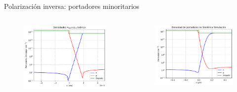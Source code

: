 \documentclass[aspectratio=169,xcolor=dvipsnames]{beamer}
\begin{document}
\begin{frame}{Polarización inversa: portadores minoritarios}
        \begin{columns}
            \begin{column}{0.5\textwidth}
                \begin{figure}
                    \includegraphics[width=0.90\linewidth]{Teorico/Densidad_portadores_inversa_cortada.pdf}
                \end{figure}
            \end{column}
            \begin{column}{0.5\textwidth}
                \begin{figure}
                    \includegraphics[width=0.90\linewidth]{Inversa/Densidad_portadores_inversa_cortada.pdf}
                \end{figure}
            \end{column}
        \end{columns}
\end{frame}
\end{document}
